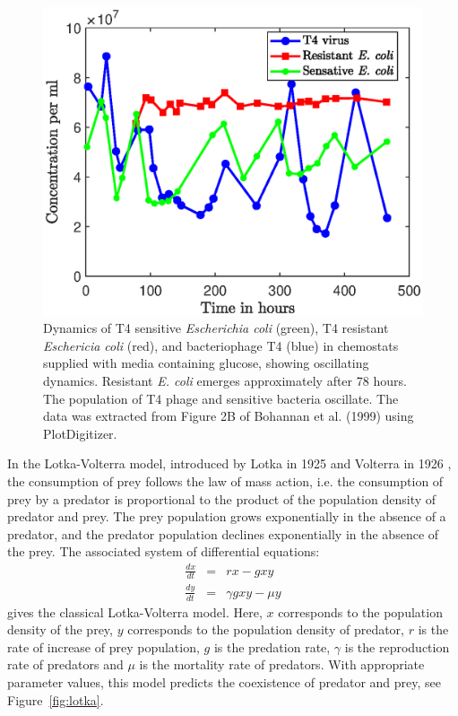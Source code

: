 \begin{figure}[t]
\captionsetup[subfigure]{labelformat=empty}
\centering
\includegraphics[scale=0.65]{L1.eps}
\caption[Dynamics of \textit{E. coli} and bacteriophage showing oscillating dynamics.]{Dynamics of T4 sensitive \textit{Escherichia coli} (green), T4 resistant \textit{Eschericia coli} (red), and bacteriophage T4 (blue) in chemostats supplied with media containing glucose, showing oscillating dynamics. Resistant \textit{E. coli} emerges approximately after 78 hours. The population of T4 phage and sensitive bacteria oscillate. The data was extracted from Figure 2B of Bohannan et al. (1999)  \cite{bohannan_effect_1999} using PlotDigitizer. }
\label{fig:levin2}
\end{figure}

In the Lotka-Volterra model, introduced by Lotka in 1925 \cite{lotka_elements_1925} and Volterra in 1926 \cite{volterra_variations_1928}, the consumption of prey follows the law of mass action, i.e. the consumption of prey by a predator is proportional to the product of the population density of predator and prey. The prey population grows exponentially in the absence of a predator, and the predator population declines exponentially in the absence of the prey.  The associated system of differential equations:   
\begin{eqnarray}\label{L-V}
\frac{dx}{dt} & =& r x - g x y \nonumber\\
\frac{dy}{dt} & = & \gamma g x y - \mu  y
\end{eqnarray}
gives the classical Lotka-Volterra model.  Here, $x$ corresponds to the population density of the prey, $y$ corresponds to the population density of predator, $r$ is the rate of increase of prey population, $g$ is the predation rate, $\gamma$ is the reproduction rate of predators and $\mu$ is the mortality rate of predators. With appropriate parameter values, this model predicts the coexistence of predator and prey, see Figure~\ref{fig:lotka}.

